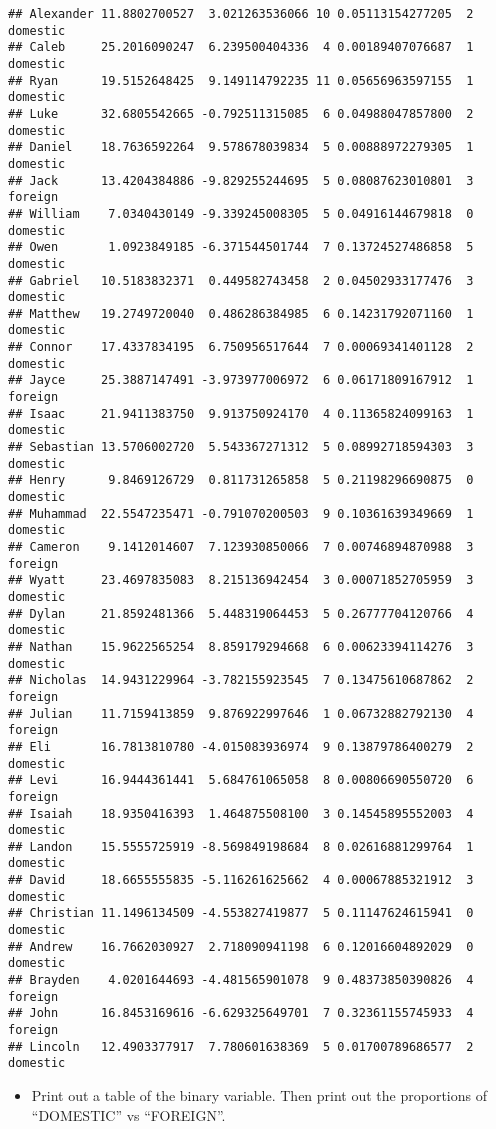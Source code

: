 \documentclass[
]{article}
\providecommand{\tightlist}{%
  \setlength{\itemsep}{0pt}\setlength{\parskip}{0pt}}
\begin{document}
\begin{verbatim}
## Alexander 11.8802700527  3.021263536066 10 0.05113154277205  2 domestic
## Caleb     25.2016090247  6.239500404336  4 0.00189407076687  1 domestic
## Ryan      19.5152648425  9.149114792235 11 0.05656963597155  1 domestic
## Luke      32.6805542665 -0.792511315085  6 0.04988047857800  2 domestic
## Daniel    18.7636592264  9.578678039834  5 0.00888972279305  1 domestic
## Jack      13.4204384886 -9.829255244695  5 0.08087623010801  3  foreign
## William    7.0340430149 -9.339245008305  5 0.04916144679818  0 domestic
## Owen       1.0923849185 -6.371544501744  7 0.13724527486858  5 domestic
## Gabriel   10.5183832371  0.449582743458  2 0.04502933177476  3 domestic
## Matthew   19.2749720040  0.486286384985  6 0.14231792071160  1 domestic
## Connor    17.4337834195  6.750956517644  7 0.00069341401128  2 domestic
## Jayce     25.3887147491 -3.973977006972  6 0.06171809167912  1  foreign
## Isaac     21.9411383750  9.913750924170  4 0.11365824099163  1 domestic
## Sebastian 13.5706002720  5.543367271312  5 0.08992718594303  3 domestic
## Henry      9.8469126729  0.811731265858  5 0.21198296690875  0 domestic
## Muhammad  22.5547235471 -0.791070200503  9 0.10361639349669  1 domestic
## Cameron    9.1412014607  7.123930850066  7 0.00746894870988  3  foreign
## Wyatt     23.4697835083  8.215136942454  3 0.00071852705959  3 domestic
## Dylan     21.8592481366  5.448319064453  5 0.26777704120766  4 domestic
## Nathan    15.9622565254  8.859179294668  6 0.00623394114276  3 domestic
## Nicholas  14.9431229964 -3.782155923545  7 0.13475610687862  2  foreign
## Julian    11.7159413859  9.876922997646  1 0.06732882792130  4  foreign
## Eli       16.7813810780 -4.015083936974  9 0.13879786400279  2 domestic
## Levi      16.9444361441  5.684761065058  8 0.00806690550720  6  foreign
## Isaiah    18.9350416393  1.464875508100  3 0.14545895552003  4 domestic
## Landon    15.5555725919 -8.569849198684  8 0.02616881299764  1 domestic
## David     18.6655555835 -5.116261625662  4 0.00067885321912  3 domestic
## Christian 11.1496134509 -4.553827419877  5 0.11147624615941  0 domestic
## Andrew    16.7662030927  2.718090941198  6 0.12016604892029  0 domestic
## Brayden    4.0201644693 -4.481565901078  9 0.48373850390826  4  foreign
## John      16.8453169616 -6.629325649701  7 0.32361155745933  4  foreign
## Lincoln   12.4903377917  7.780601638369  5 0.01700789686577  2 domestic
\end{verbatim}

\begin{itemize}
\tightlist
\item
  Print out a table of the binary variable. Then print out the
  proportions of ``DOMESTIC'' vs ``FOREIGN''.
\end{itemize}
\end{document}
